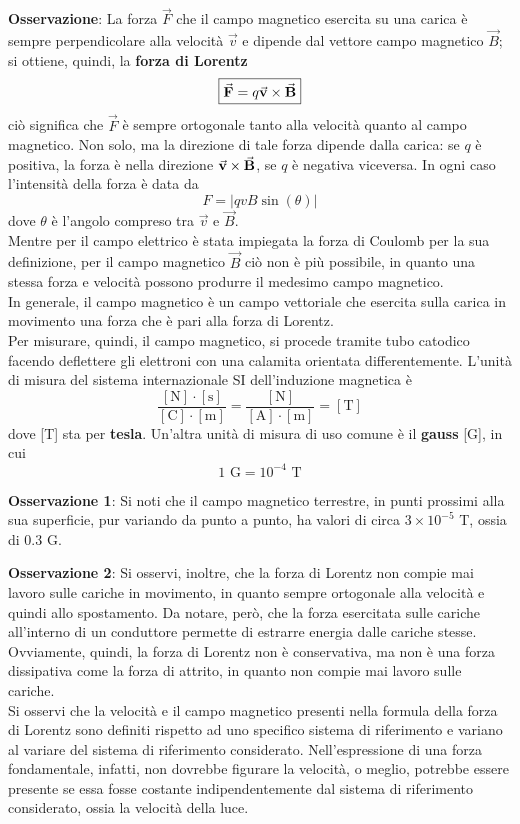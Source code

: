 \documentclass[a4paper]{extarticle}
\begin{document}
\vspace{1em}
\noindent
\textbf{Osservazione}: La forza $\vec F$ che il campo magnetico esercita su una carica è sempre perpendicolare alla velocità $\vec v$ e dipende dal vettore campo magnetico $\vec B$; si ottiene, quindi, la \textbf{forza di Lorentz}
\[\boxed{\va{F} = q \va{v} \times \va{B}}\]
ciò significa che $\vec F$ è sempre ortogonale tanto alla velocità quanto al campo magnetico. Non solo, ma la direzione di tale forza dipende dalla carica: se $q$ è positiva, la forza è nella direzione $\va{v} \times \va{B}$, se $q$ è negativa viceversa. In ogni caso l'intensità della forza è data da
\[F = \vert q v B \sin(\theta)\vert\]
dove $\theta$ è l'angolo compreso tra $\vec{v}$ e $\vec{B}$.\\
Mentre per il campo elettrico è stata impiegata la forza di Coulomb per la sua definizione, per il campo magnetico $\vec B$ ciò non è più possibile, in quanto una stessa forza e velocità possono produrre il medesimo campo magnetico.\\
In generale, il campo magnetico è un campo vettoriale che esercita sulla carica in movimento una forza che è pari alla forza di Lorentz.\\
Per misurare, quindi, il campo magnetico, si procede tramite tubo catodico facendo deflettere gli elettroni con una calamita orientata differentemente. L'unità di misura del sistema internazionale SI dell'induzione magnetica è
\[\dfrac{[\text{N}] \cdot [\text{s}]}{[\text{C}] \cdot [\text{m}]} = \dfrac{[\text{N}]}{[\text{A}] \cdot [\text{m}]} = [\text{T}]\]
dove [T] sta per \textbf{tesla}. Un'altra unità di misura di uso comune è il \textbf{gauss} [G], in cui
\[1 \text{ G} = 10^{-4} \text{ T}\] 

\vspace{1em}
\noindent
\textbf{Osservazione 1}: Si noti che il campo magnetico terrestre, in punti prossimi alla sua superficie, pur variando da punto a punto, ha valori di circa $3 \times 10^{-5}$ T, ossia di $0.3$ G.

\vspace{1em}
\noindent
\textbf{Osservazione 2}: Si osservi, inoltre, che la forza di Lorentz non compie mai lavoro sulle cariche in movimento, in quanto sempre ortogonale alla velocità e quindi allo spostamento. Da notare, però, che la forza esercitata sulle cariche all'interno di un conduttore permette di estrarre energia dalle cariche stesse.\\
Ovviamente, quindi, la forza di Lorentz non è conservativa, ma non è una forza dissipativa come la forza di attrito, in quanto non compie mai lavoro sulle cariche.\\
Si osservi che la velocità e il campo magnetico presenti nella formula della forza di Lorentz sono definiti rispetto ad uno specifico sistema di riferimento e variano al variare del sistema di riferimento considerato. Nell'espressione di una forza fondamentale, infatti, non dovrebbe figurare la velocità, o meglio, potrebbe essere presente se essa fosse costante indipendentemente dal sistema di riferimento considerato, ossia la velocità della luce.
\end{document}
